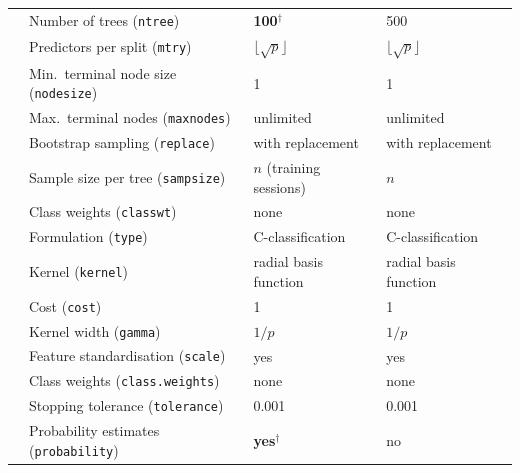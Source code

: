 \begin{table}[htbp]
\begin{tabular}{llll}
      & Number of trees (\texttt{ntree})       & \textbf{100}$^\dagger$ & 500 \\
      & Predictors per split (\texttt{mtry})   & $\lfloor\sqrt{p}\rfloor$ & $\lfloor\sqrt{p}\rfloor$ \\
      & Min.\ terminal node size (\texttt{nodesize}) & 1          & 1 \\
      & Max.\ terminal nodes (\texttt{maxnodes}) & unlimited      & unlimited \\
      & Bootstrap sampling (\texttt{replace})  & with replacement & with replacement \\
      & Sample size per tree (\texttt{sampsize}) & $n$ (training sessions) & $n$ \\
      & Class weights (\texttt{classwt})       & none             & none \\
    \midrule
      & Formulation (\texttt{type})            & C-classification & C-classification \\
      & Kernel (\texttt{kernel})               & radial basis function & radial basis function \\
      & Cost (\texttt{cost})                   & 1                & 1 \\
      & Kernel width (\texttt{gamma})          & $1/p$            & $1/p$ \\
      & Feature standardisation (\texttt{scale}) & yes            & yes \\
      & Class weights (\texttt{class.weights}) & none             & none \\
      & Stopping tolerance (\texttt{tolerance}) & 0.001           & 0.001 \\
      & Probability estimates (\texttt{probability}) & \textbf{yes}$^\dagger$ & no \\
    \bottomrule
  \end{tabular}
\end{table}
